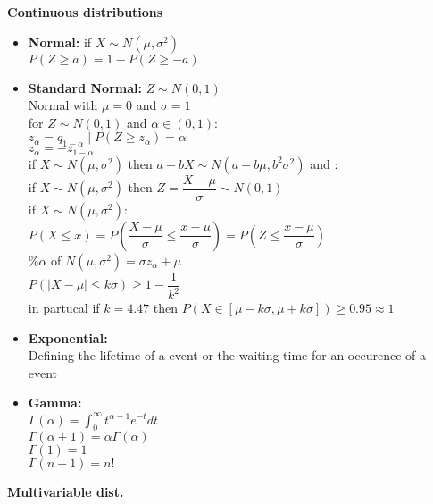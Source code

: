 \documentclass[a4paper, 10pt, landscape]{article}
\begin{document}
\begin{multicols*}{4}
\textbf{Continuous distributions}
\begin{itemize}
\item{\textbf{Normal:} if $X\sim N(\mu, \sigma^2)$ \\ \textbullet $P(Z\geq a)=1-P(Z\geq -a)$}
\item{\textbf{Standard Normal:} $Z\sim N(0,1)$\\ \textbullet Normal with $\mu=0$ and $\sigma=1$ \\ for $Z\sim N(0,1)$ and $\alpha \in (0,1)$: \\ \textbullet $z_{\alpha} = q_{1-\alpha}\mid P(Z\geq z_{\alpha})=\alpha$ \\ \textbullet $z_{\alpha}=-z_{1-\alpha}$ \\ \textbullet if $X\sim N(\mu, \sigma^2)$ then $a+bX\sim N(a+b\mu, b^2\sigma^2)$ and : \\  if $X\sim N(\mu, \sigma^2)$ then $Z=\dfrac{X-\mu}{\sigma}\sim N(0,1)$ \\ \textbullet if $X \sim N(\mu, \sigma^2)$: \\  $P(X\leq x) = P(\dfrac{X-\mu}{\sigma} \leq \dfrac{x-\mu}{\sigma}) = P(Z\leq \dfrac{x-\mu}{\sigma})$ \\ \textbullet $\%\alpha$ of $N(\mu,\sigma^2) = \sigma z_{\alpha} + \mu$ \\ \textbullet $P(\mid X - \mu \mid \leq k\sigma) \geq 1 -\dfrac{1}{k^2}$ \\ in partucal if $k=4.47$ then $P(X \in \left[ \mu - k \sigma , \mu + k \sigma \right] ) \geq 0.95 \approx 1$}
\item{\textbf{Exponential:} \\ \textbullet Defining the lifetime of a event or the waiting time  for an occurence of a event}
\item{\textbf{Gamma:} \\ \textbullet $\Gamma (\alpha) = \displaystyle{\int_0^{\infty} t^{\alpha-1} e^{-t} dt}$ \\ \textbullet $\Gamma (\alpha+1)=\alpha \Gamma (\alpha)$ \\
\textbullet $\Gamma (1)=1$ \\ \textbullet $\Gamma (n+1)=n!$}
\end{itemize}

\textbf{\footnotesize Multivariable dist.}


\end{multicols*}
\end{document}
